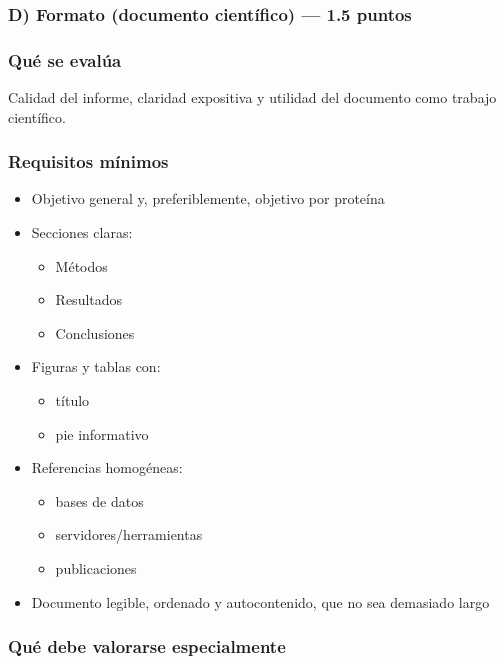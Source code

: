 \documentclass[
  11pt,
  a4paper,
  twoside]{scrreprt}
\providecommand{\tightlist}{%
  \setlength{\itemsep}{0pt}\setlength{\parskip}{0pt}}
\begin{document}
\subsubsection{D) Formato (documento científico) --- 1.5
puntos}\label{d-formato-documento-cientuxedfico-1.5-puntos}

\subsubsection{Qué se evalúa}\label{quuxe9-se-evaluxfaa-3}

Calidad del informe, claridad expositiva y utilidad del documento como
trabajo científico.

\subsubsection{Requisitos mínimos}\label{requisitos-muxednimos}

\begin{itemize}
\item
  Objetivo general y, preferiblemente, objetivo por proteína
\item
  Secciones claras:

  \begin{itemize}
  \tightlist
  \item
    Métodos
  \item
    Resultados
  \item
    Conclusiones
  \end{itemize}
\item
  Figuras y tablas con:

  \begin{itemize}
  \tightlist
  \item
    título
  \item
    pie informativo
  \end{itemize}
\item
  Referencias homogéneas:

  \begin{itemize}
  \tightlist
  \item
    bases de datos
  \item
    servidores/herramientas
  \item
    publicaciones
  \end{itemize}
\item
  Documento legible, ordenado y autocontenido, que no sea demasiado
  largo
\end{itemize}

\subsubsection{Qué debe valorarse
especialmente}\label{quuxe9-debe-valorarse-especialmente-3}
\end{document}
